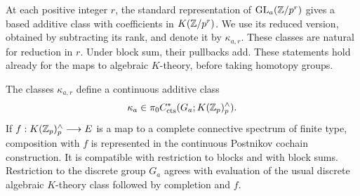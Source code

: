 At each positive integer $r$, the standard representation of
$\operatorname{GL}_a(\mathbb Z/p^r)$ gives a based additive class with coefficients in
$K(\mathbb Z/p^r)$.  We use its reduced version, obtained by subtracting its
rank, and denote it by $\kappa_{a,r}$.  These classes are natural for
reduction in $r$.  Under block sum, their pullbacks add.  These
statements hold already for the maps to algebraic $K$-theory, before
taking homotopy groups.

\begin{lemma}
\label{gen:k-continuity}
The classes $\kappa_{a,r}$ define a continuous additive class
\[
 \kappa_a\in
 \pi_0 C^*_{\mathrm{cts}}(G_a;K(\mathbb Z_p)^\wedge_p).
\]
If $f:K(\mathbb Z_p)^\wedge_p\longrightarrow E$ is a map to a complete
connective spectrum of finite type, composition with $f$ is represented
in the continuous Postnikov cochain construction.  It is compatible
with restriction to blocks and with block sums.  Restriction to the
discrete group $G_a$ agrees with evaluation of the usual discrete
algebraic $K$-theory class followed by completion and $f$.
\end{lemma}

